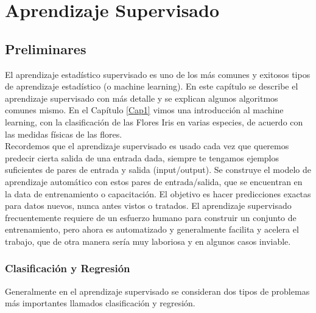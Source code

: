 



	
	\chapter{Aprendizaje Supervisado}{\label{Cap2}}

	

	

	

\section{Preliminares}            


El  aprendizaje estadístico  supervisado es uno de los más comunes y exitosos tipos de aprendizaje estadístico  (o machine learning). En este capítulo se describe el aprendizaje supervisado con más detalle y se explican algunos algoritmos comunes mismo. En el Capítulo \ref{Cap1}  vimos una introducción al machine learning, con  la clasificación de las Flores Iris en varias especies, de acuerdo con las medidas físicas de las flores.\\

Recordemos que el aprendizaje supervisado es usado cada vez que queremos predecir cierta salida de una entrada dada, siempre te tengamos ejemplos suficientes de pares de entrada y salida  (input{\scriptsize/}output). Se construye el modelo de aprendizaje automático con estos pares de entrada{\scriptsize/}salida, que se encuentran en  la data de entrenamiento o capacitación. El objetivo es hacer predicciones exactas para datos nuevos, nunca antes vistos o tratados.   El aprendizaje supervisado frecuentemente requiere de un esfuerzo humano para construir un conjunto de entrenamiento,  pero ahora  es automatizado y generalmente facilita y acelera el trabajo, que de otra manera sería muy laboriosa y  en algunos casos inviable.


\subsection{Clasificación y Regresión}


Generalmente en el aprendizaje supervisado se consideran dos tipos de problemas más importantes llamados clasificación y regresión.\\

